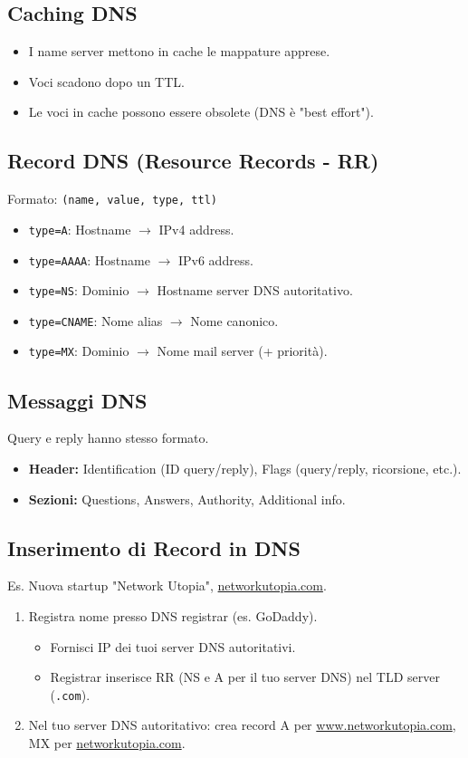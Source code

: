 \documentclass{article}
\begin{document}
\subsection{Caching DNS}
\begin{itemize}
    \item I name server mettono in cache le mappature apprese.
    \item Voci scadono dopo un TTL.
    \item Le voci in cache possono essere obsolete (DNS è "best effort").
\end{itemize}

\subsection{Record DNS (Resource Records - RR)}
Formato: \texttt{(name, value, type, ttl)}
\begin{itemize}
    \item \texttt{type=A}: Hostname $\rightarrow$ IPv4 address.
    \item \texttt{type=AAAA}: Hostname $\rightarrow$ IPv6 address.
    \item \texttt{type=NS}: Dominio $\rightarrow$ Hostname server DNS autoritativo.
    \item \texttt{type=CNAME}: Nome alias $\rightarrow$ Nome canonico.
    \item \texttt{type=MX}: Dominio $\rightarrow$ Nome mail server (+ priorità).
\end{itemize}

\subsection{Messaggi DNS}
Query e reply hanno stesso formato.
\begin{itemize}
    \item \textbf{Header:} Identification (ID query/reply), Flags (query/reply, ricorsione, etc.).
    \item \textbf{Sezioni:} Questions, Answers, Authority, Additional info.
\end{itemize}

\subsection{Inserimento di Record in DNS}
Es. Nuova startup "Network Utopia", \url{networkutopia.com}.
\begin{enumerate}
    \item Registra nome presso DNS registrar (es. GoDaddy).
    \begin{itemize}
        \item Fornisci IP dei tuoi server DNS autoritativi.
        \item Registrar inserisce RR (NS e A per il tuo server DNS) nel TLD server (\texttt{.com}).
    \end{itemize}
    \item Nel tuo server DNS autoritativo: crea record A per \url{www.networkutopia.com}, MX per \url{networkutopia.com}.
\end{enumerate}
\end{document}
